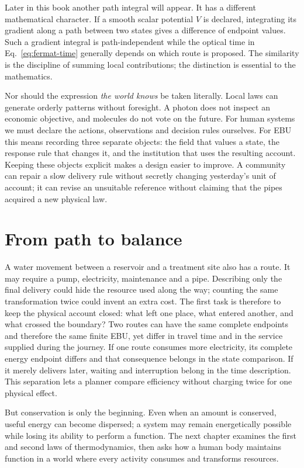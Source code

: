 Later in this book another path integral will appear. It has a different mathematical character. If a smooth scalar potential $V$ is declared, integrating its gradient along a path between two states gives a difference of endpoint values. Such a gradient integral is path-independent while the optical time in Eq.~\eqref{eq:fermat-time} generally depends on which route is proposed. The similarity is the discipline of summing local contributions; the distinction is essential to the mathematics.

Nor should the expression \emph{the world knows} be taken literally. Local laws can generate orderly patterns without foresight. A photon does not inspect an economic objective, and molecules do not vote on the future. For human systems we must declare the actions, observations and decision rules ourselves. For EBU this means recording three separate objects: the field that values a state, the response rule that changes it, and the institution that uses the resulting account. Keeping these objects explicit makes a design easier to improve. A community can repair a slow delivery rule without secretly changing yesterday's unit of account; it can revise an unsuitable reference without claiming that the pipes acquired a new physical law.

\section{From path to balance}
A water movement between a reservoir and a treatment site also has a route. It may require a pump, electricity, maintenance and a pipe. Describing only the final delivery could hide the resource used along the way; counting the same transformation twice could invent an extra cost. The first task is therefore to keep the physical account closed: what left one place, what entered another, and what crossed the boundary? Two routes can have the same complete endpoints and therefore the same finite EBU, yet differ in travel time and in the service supplied during the journey. If one route consumes more electricity, its complete energy endpoint differs and that consequence belongs in the state comparison. If it merely delivers later, waiting and interruption belong in the time description. This separation lets a planner compare efficiency without charging twice for one physical effect.

But conservation is only the beginning. Even when an amount is conserved, useful energy can become dispersed; a system may remain energetically possible while losing its ability to perform a function. The next chapter examines the first and second laws of thermodynamics, then asks how a human body maintains function in a world where every activity consumes and transforms resources.
